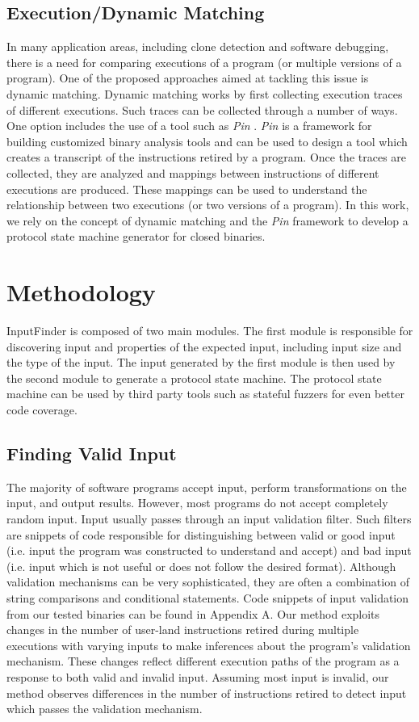 \documentclass{sig-alternate-05-2015}
\def \tool {InputFinder}
\begin{document}
\subsection{Execution/Dynamic Matching} \label{bg_dynamicsim}
In many application areas, including clone detection and software debugging, there is a need for comparing executions of a program (or multiple versions of a program).
One of the proposed approaches aimed at tackling this issue is dynamic matching.
Dynamic matching works by first collecting execution traces of different executions.
Such traces can be collected through a number of ways.
One option includes the use of a tool such as \textit{Pin} \cite{pintool}.
\textit{Pin} is a framework for building customized binary analysis tools and can be used to design a tool which creates a transcript of the instructions retired by a program.
Once the traces are collected, they are analyzed and mappings between instructions of different executions are produced.
These mappings can be used to understand the relationship between two executions (or two versions of a program).
In this work, we rely on the concept of dynamic matching and the \textit{Pin} framework to develop a protocol state machine generator for closed binaries.

\section{Methodology} \label{methodology}

\tool{} is composed of two main modules.
The first module is responsible for discovering input and properties of the expected input, including input size and the type of the input.
The input generated by the first module is then used by the second module to generate a protocol state machine.
The protocol state machine can be used by third party tools such as stateful fuzzers for even better code coverage.
\subsection{Finding Valid Input}
The majority of software programs accept input, perform transformations on the input, and output results.
However, most programs do not accept completely random input.
Input usually passes through an input validation filter.
Such filters are snippets of code responsible for distinguishing between valid or good input (i.e. input the program was constructed to understand and accept) and bad input (i.e. input which is not useful or does not follow the desired format).
Although validation mechanisms can be very sophisticated, they are often a combination of string comparisons and conditional statements.
Code snippets of input validation from our tested binaries can be found in Appendix A.
Our method exploits changes in the number of user-land instructions retired during multiple executions with varying inputs to make inferences about the program's validation mechanism.
These changes reflect different execution paths of the program as a response to both valid and invalid input.
Assuming most input is invalid, our method observes differences in the number of instructions retired to detect input which passes the validation mechanism.
\end{document}
